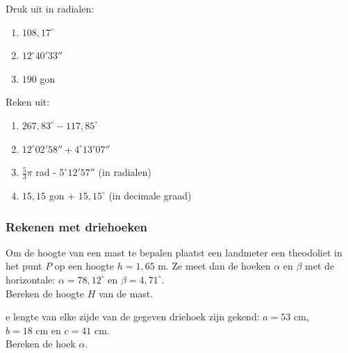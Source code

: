 \begin{oef}
	Druk uit in radialen:
	\begin{enumerate}
		\item $108,17^\circ$ 
		\item $12^\circ 40' 33''$ 
		\item $190$ gon
	\end{enumerate}
\end{oef}

\begin{oef}
	Reken uit:
	\begin{enumerate}
		\item $267,83^\circ - 117,85^\circ$
		\item $12^\circ 02' 58'' + 4^\circ 13' 07''$
		\item $\frac{5}{3}\pi$ rad - $5^\circ 12' 57''$ (in radialen)
		\item $15,15$ gon + $15,15^\circ$ (in decimale graad)
	\end{enumerate}
\end{oef}

\subsubsection{Rekenen met driehoeken}

\begin{oef}
Om de hoogte van een mast te bepalen plaatst een landmeter een theodoliet in het punt $P$ op een hoogte $h=1,65$ m. Ze meet dan de hoeken $\alpha$ en $\beta$ met de horizontale: $\alpha=78,12^\circ$ en $\beta=4,71^\circ$.\\
Bereken de hoogte $H$ van de mast.


\end{oef}

\begin{oef}
e lengte van elke zijde van de gegeven driehoek zijn gekend: $a=53$ cm, \\ $b=18$ cm en $c=41$ cm.\\
Bereken de hoek $\alpha$.

\end{oef}

